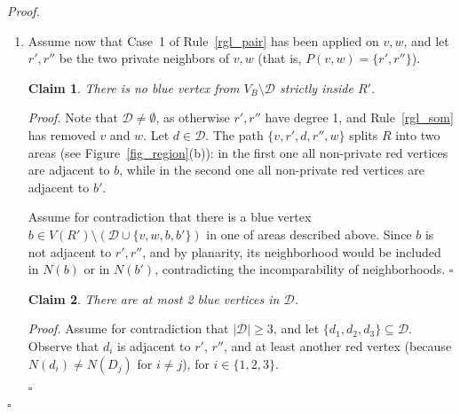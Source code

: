 \documentclass[a4paper,11pt]{article}
\newtheorem{claimN} {Claim}
\newcommand{\rrgl}   [1] {Rule~\ref{#1}\xspace}
\newenvironment{proof}{\noindent \textit{Proof. }}{\hfill$\square$\vspace{.2cm}}
\begin{document}
\begin{proof}
\begin{enumerate}
    \begin{figure}[h!tb]
\begin{center}
   \texttt{[image: region0a.pdf]}
   \texttt{[image: region0b.pdf]}
   \texttt{[image: region0c.pdf]}
\end{center}
\vspace{-.4cm}
   \caption{Possible configurations when $|P(v,w)| = 0$ in the proof of Proposition~\ref{prop_nb_incl}.}
   \label{fig_region-NEW}
\end{figure}

\item
Assume now that Case~1 of \rrgl{rgl_pair} has been applied on $v,w$, and let $r',r''$ be the two private neighbors of $v,w$ (that is, $P(v,w) =  \{r',r''\}$).\\


 \begin{claimN}\label{claim:case1nD}
There is no blue vertex from $V_B \setminus \mathcal{D}$ strictly inside $R'$.
    \end{claimN}

    \begin{proof}
    Note that $\mathcal{D} \neq \emptyset$, as otherwise $r',r''$ have degree 1, and \rrgl{rgl_som} has removed $v$ and $w$. Let $d \in\mathcal{D}$. The path $\{v,r',d,r'',w \}$ splits $R$ into two areas (see Figure~\ref{fig_region}(b)): in the first one all non-private red vertices are adjacent to $b$,  while in the second one all non-private red vertices are adjacent to $b'$.

    Assume for contradiction that there is a blue vertex $b \in V(R') \setminus (\mathcal{D}\cup\{v,w,b,b'\})$ in one of areas described above.
    Since $b$ is not adjacent to $r',r''$, and by planarity, its neighborhood would be included in $N(b)$ or in $N(b')$, contradicting the incomparability of neighborhoods.
\end{proof}

    \begin{claimN}\label{claim:case1D}
There are at most 2 blue vertices in $\mathcal{D}$.
    \end{claimN}

    \begin{proof}
     Assume for contradiction that $|\mathcal{D}| \geq 3$, and let $\{d_1,d_2,d_3\} \subseteq \mathcal{D}$. Observe that $d_i$ is adjacent to $r'$, $r''$, and at least another red vertex (because $N(d_i) \neq N(D_j)$ for $i \neq j$), for $i \in \{1,2,3\}$.



\end{proof}
\end{enumerate}
\end{proof}
\end{document}

